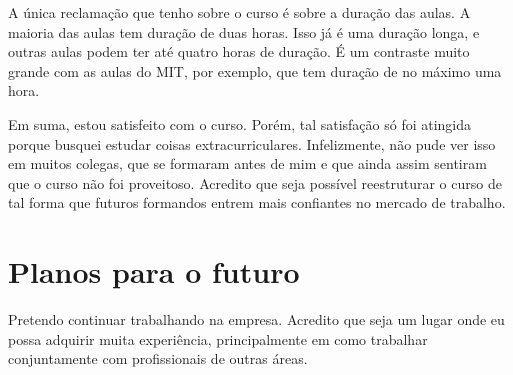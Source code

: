 A única reclamação que tenho sobre o curso é sobre a duração das aulas. A maioria das aulas tem duração de duas horas. 
Isso já é uma duração longa, e outras aulas podem ter até quatro horas de duração. É um contraste muito grande com as aulas do MIT, 
por exemplo, que tem duração de no máximo uma hora.

Em suma, estou satisfeito com o curso. Porém, tal satisfação só foi atingida porque busquei estudar coisas extracurriculares. 
Infelizmente, não pude ver isso em muitos colegas, que se formaram antes de mim e que ainda assim sentiram que o curso não foi proveitoso. 
Acredito que seja possível reestruturar o curso de tal forma que futuros formandos entrem mais confiantes no mercado de trabalho.


\section{Planos para o futuro}

Pretendo continuar trabalhando na empresa. Acredito que seja um lugar onde eu possa adquirir muita experiência,
principalmente em como trabalhar conjuntamente com profissionais de outras áreas.

